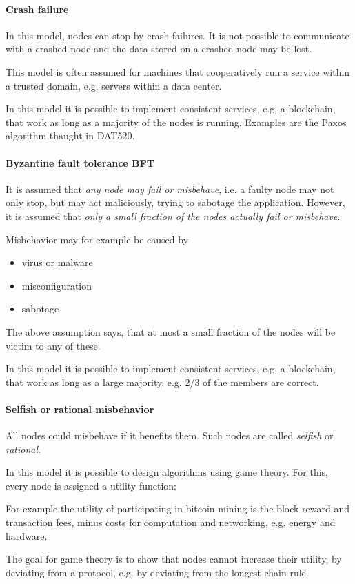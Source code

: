 \paragraph{Crash failure}
In this model, nodes can stop by crash failures. It is not possible to communicate with a crashed node and the data stored on a crashed node may be lost.

This model is often assumed for machines that cooperatively run a service within a trusted domain, e.g. servers within a data center. 

In this model it is possible to implement consistent services, e.g. a blockchain, that work as long as a majority of the nodes is running. Examples are the Paxos algorithm thaught in DAT520.

\paragraph{Byzantine fault tolerance BFT}
It is assumed that \emph{any node may fail or misbehave}, i.e. a faulty node may not only stop, but may act maliciously, trying to sabotage the application. However, it is assumed that \emph{only a small fraction of the nodes actually fail or misbehave}.

Misbehavior may for example be caused by 
\begin{itemize}
	\item virus or malware
	\item misconfiguration
	\item sabotage
\end{itemize}
The above assumption says, that at most a small fraction of the nodes will be victim to any of these.

In this model it is possible to implement consistent services, e.g. a blockchain, that work as long as a large majority, e.g. 2/3 of the members are correct.

\paragraph{Selfish or rational misbehavior}
All nodes could misbehave if it benefits them. Such nodes are called \emph{selfish} or \emph{rational}. 

In this model it is possible to design algorithms using game theory. 
For this, every node is assigned a utility function:

For example the utility of participating in bitcoin mining is the block reward and transaction fees, minus costs for computation and networking, e.g. energy and hardware.

The goal for game theory is to show that nodes cannot increase their utility, by deviating from a protocol, e.g. by deviating from the longest chain rule.

